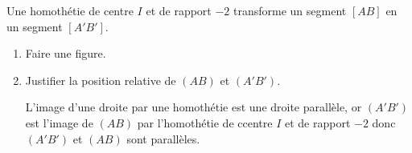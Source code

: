     Une homothétie de centre $I$ et de rapport $-2$ transforme un segment $[AB]$ en un segment $[A'B']$.

    \begin{enumerate}
        \item Faire une figure.

        \item Justifier la position relative de $(AB)$ et $(A'B')$.

        {\color{red} L'image d'une droite par une homothétie est une droite parallèle, or $(A'B')$ est l'image de $(AB)$ par l'homothétie de ccentre $I$ et de rapport $-2$
        donc $(A'B')$ et $(AB)$ sont parallèles.}
    \end{enumerate}

